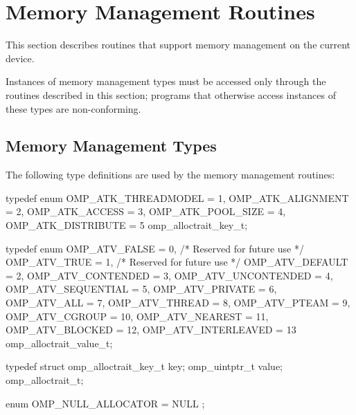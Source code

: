 \section{Memory Management Routines}
\label{sec:Memory Management Routines}
This section describes routines that support memory management on the current device.

Instances of memory management types must be accessed only through the routines described in this section; programs that otherwise access instances of these types are non-conforming.

\subsection{Memory Management Types}
\label{subsec:Memory Management Types}

The following type definitions are used by the memory management routines:

\begin{ccppspecific}
\begin{ompEnv}
typedef enum {
  OMP_ATK_THREADMODEL = 1,
  OMP_ATK_ALIGNMENT = 2,
  OMP_ATK_ACCESS = 3,
  OMP_ATK_POOL_SIZE = 4,
  OMP_ATK_DISTRIBUTE = 5
} omp_alloctrait_key_t;

typedef enum {
  OMP_ATV_FALSE = 0,   /* Reserved for future use */
  OMP_ATV_TRUE = 1,    /* Reserved for future use */
  OMP_ATV_DEFAULT = 2,
  OMP_ATV_CONTENDED = 3,
  OMP_ATV_UNCONTENDED = 4,
  OMP_ATV_SEQUENTIAL = 5,
  OMP_ATV_PRIVATE = 6,
  OMP_ATV_ALL = 7,
  OMP_ATV_THREAD = 8,
  OMP_ATV_PTEAM = 9,
  OMP_ATV_CGROUP = 10,
  OMP_ATV_NEAREST = 11,
  OMP_ATV_BLOCKED = 12,
  OMP_ATV_INTERLEAVED = 13
} omp_alloctrait_value_t;

typedef struct {
  omp_alloctrait_key_t key;
  omp_uintptr_t value;
} omp_alloctrait_t;

enum { OMP_NULL_ALLOCATOR = NULL };
\end{ompEnv}
\end{ccppspecific}

